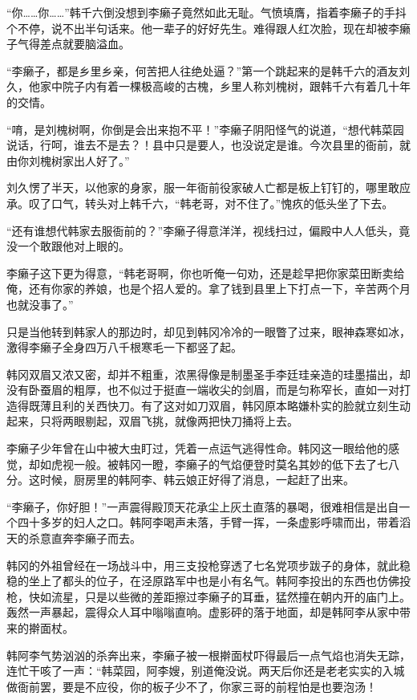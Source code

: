 “你……你……”韩千六倒没想到李癞子竟然如此无耻。气愤填膺，指着李癞子的手抖个不停，说不出半句话来。他一辈子的好好先生。难得跟人红次脸，现在却被李癞子气得差点就要脑溢血。

“李癞子，都是乡里乡亲，何苦把人往绝处逼？”第一个跳起来的是韩千六的酒友刘久，他家中院子内有着一棵极高峻的古槐，乡里人称刘槐树，跟韩千六有着几十年的交情。

“唷，是刘槐树啊，你倒是会出来抱不平！”李癞子阴阳怪气的说道，“想代韩菜园说话，行呵，谁去不是去？！县中只是要人，也没说定是谁。今次县里的衙前，就由你刘槐树家出人好了。”

刘久愣了半天，以他家的身家，服一年衙前役家破人亡都是板上钉钉的，哪里敢应承。叹了口气，转头对上韩千六，“韩老哥，对不住了。”愧疚的低头坐了下去。

“还有谁想代韩家去服衙前的？”李癞子得意洋洋，视线扫过，偏殿中人人低头，竟没一个敢跟他对上眼的。

李癞子这下更为得意，“韩老哥啊，你也听俺一句劝，还是趁早把你家菜田断卖给俺，还有你家的养娘，也是个招人爱的。拿了钱到县里上下打点一下，辛苦两个月也就没事了。”

只是当他转到韩家人的那边时，却见到韩冈冷冷的一眼瞥了过来，眼神森寒如冰，激得李癞子全身四万八千根寒毛一下都竖了起。

韩冈双眉又浓又密，却并不粗重，浓黑得像是制墨圣手李廷珪亲造的珪墨描出，却没有卧蚕眉的粗厚，也不似过于挺直一端收尖的剑眉，而是匀称窄长，直如一对打造得既薄且利的关西快刀。有了这对如刀双眉，韩冈原本略嫌朴实的脸就立刻生动起来，只将两眼剔起，双眉飞挑，就像两把快刀捅将上去。

李癞子少年曾在山中被大虫盯过，凭着一点运气逃得性命。韩冈这一眼给他的感觉，却如虎视一般。被韩冈一瞪，李癞子的气焰便登时莫名其妙的低下去了七八分。这时候，厨房里的韩阿李、韩云娘正好得了消息，一起赶了出来。

“李癞子，你好胆！”一声震得殿顶天花承尘上灰土直落的暴喝，很难相信是出自一个四十多岁的妇人之口。韩阿李喝声未落，手臂一挥，一条虚影呼啸而出，带着滔天的杀意直奔李癞子而去。

韩冈的外祖曾经在一场战斗中，用三支投枪穿透了七名党项步跋子的身体，就此稳稳的坐上了都头的位子，在泾原路军中也是小有名气。韩阿李投出的东西也仿佛投枪，快如流星，只是以些微的差距擦过李癞子的耳垂，猛然撞在朝内开的庙门上。轰然一声暴起，震得众人耳中嗡嗡直响。虚影砰的落于地面，却是韩阿李从家中带来的擀面杖。

韩阿李气势汹汹的杀奔出来，李癞子被一根擀面杖吓得最后一点气焰也消失无踪，连忙干咳了一声：“韩菜园，阿李嫂，别道俺没说。两天后你还是老老实实的入城做衙前罢，要是不应役，你的板子少不了，你家三哥的前程怕是也要泡汤！

